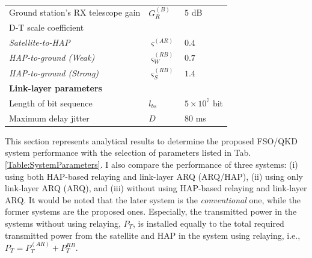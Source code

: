 \documentclass[conference]{IEEEtran}
\begin{document}
\begin{table}[t]
\begin{center}
{\begin{tabular}{lll}
Ground station's RX telescope gain                   	& $G_R^{(B)}$                		& $5$ dB\\
D-T scale coefficient\\              								
\hspace{5mm}\textit{Satellite-to-HAP}				& $\varsigma^{(AR)}$    		& $0.4$\\
\hspace{5mm}\textit{HAP-to-ground (Weak)}	& $\varsigma^{(RB)}_W$		& $0.7$\\
\hspace{5mm}\textit{HAP-to-ground (Strong)}	& $\varsigma^{(RB)}_S$    	& $1.4$\\
\hline
\textbf{Link-layer parameters}\\
Length of bit sequence                            				& $l_{bs}$              				& $5\times 10^7$ bit\\
Maximum delay jitter                               				& $D$                      				& $80$ ms\\
\hline \hline
\end{tabular}
}
\end{center}
\end{table}

This section represents analytical results to determine the proposed FSO/QKD system performance with the selection of parameters listed in Tab. \ref{Table:SystemParameters}. I also compare the performance of three systems: (i) using both HAP-based relaying and link-layer ARQ (ARQ/HAP), (ii) using only link-layer ARQ (ARQ), and (iii) without using HAP-based relaying and link-layer ARQ. It would be noted that the later system is the \emph{conventional} one, while the former systems are the proposed ones. Especially, the transmitted power in the systems without using relaying, $P_T$, is installed equally to the total required transmitted power from the satellite and HAP in the system using relaying, i.e., $P_T=P_T^{(AR)}+P_T^{RB}$.
\end{document}
